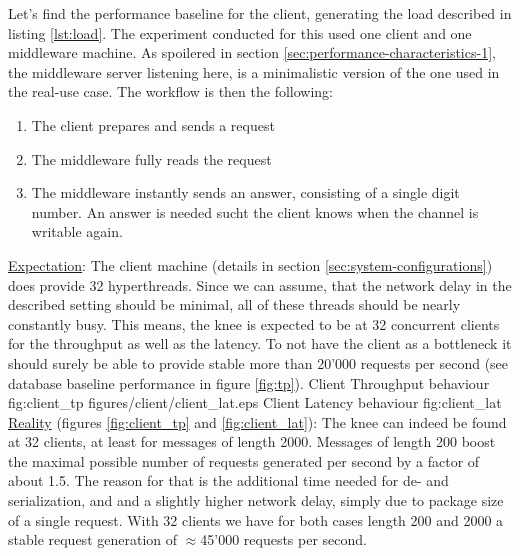 \documentclass[11pt]{article}
\begin{document}
Let's find the performance baseline for the client, generating the load described in listing \ref{lst:load}. The experiment conducted for this used one client and one middleware machine. As spoilered in section \ref{sec:performance-characteristics-1}, the middleware server listening here, is a minimalistic version of the one used in the real-use case. The workflow is then the following:
\begin{enumerate}
	\item The client prepares and sends a request
	\item The middleware fully reads the request
	\item The middleware instantly sends an answer, consisting of a single digit number. An answer is needed sucht the client knows when the channel is writable again.
\end{enumerate}
\underline{Expectation}: The client machine (details in section \ref{sec:system-configurations}) does provide 32 hyperthreads. Since we can assume, that the network delay in the described setting should be minimal, all of these threads should be nearly constantly busy. This means, the knee is expected to be at 32 concurrent clients for the throughput as well as the latency. To not have the client as a bottleneck it should surely be able to provide stable more than 20'000 requests per second (see database baseline performance in figure \ref{fig:tp}).
 {Client Throughput behaviour} {fig:client_tp}
{figures/client/client_lat.eps} {Client Latency behaviour} {fig:client_lat}
\newline\underline{Reality} (figures \ref{fig:client_tp} and \ref{fig:client_lat}): The knee can indeed be found at 32 clients, at least for messages of length 2000. Messages of length 200 boost the maximal possible number of requests generated per second by a factor of about 1.5. The reason for that is the additional time needed for de- and serialization, and and a slightly higher network delay, simply due to package size of a single request. With 32 clients we have for both cases length 200 and 2000 a stable request generation of $\approx$45'000 requests per second.
\end{document}
